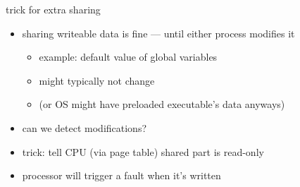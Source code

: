 \begin{frame}{trick for extra sharing}
\begin{itemize}
\item sharing writeable data is fine --- until either process modifies it
    \begin{itemize}
    \item example: default value of global variables
    \item might typically not change
    \item (or OS might have preloaded executable's data anyways)
    \end{itemize}
\item can we detect modifications?
\vspace{.5cm}
\item<2-> trick: tell CPU (via page table) shared part is read-only
\item<2-> processor will trigger a fault when it's written
\end{itemize}
\end{frame}

